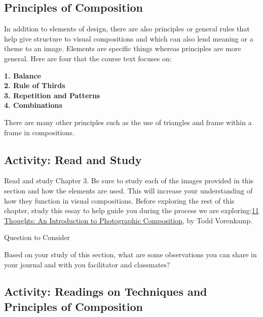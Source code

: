 \documentclass[
]{book}
\begin{document}
\hypertarget{principles-of-composition}{%
\subsection{Principles of Composition}\label{principles-of-composition}}

In addition to elements of design, there are also principles or general rules that help give structure to visual compositions and which can also lend meaning or a theme to an image. Elements are specific things whereas principles are more general. Here are four that the course text focuses on:

\textbf{1. Balance}\\
\textbf{2. Rule of Thirds}\\
\textbf{3. Repetition and Patterns}\\
\textbf{4. Combinations}

There are many other principles such as the use of triangles and frame within a frame in compositions.

\hypertarget{activity-read-and-study}{%
\subsection*{Activity: Read and Study}\label{activity-read-and-study}}

\begin{reflect}
Read and study Chapter 3. Be sure to study each of the images provided in this section and how the elements are used. This will increase your understanding of how they function in visual compositions.
Before exploring the rest of this chapter, study this essay to help guide you during the process we are exploring:\href{https://www.bhphotovideo.com/explora/photography/tips-and-solutions/11-thoughts-introduction-photographic-composition}{11 Thoughts: An Introduction to Photographic Composition}, by Todd Vorenkamp.

{Question to Consider}

Based on your study of this section, what are some observations you can share in your journal and with you facilitator and classmates?
\end{reflect}

\hypertarget{activity-readings-on-techniques-and-principles-of-composition}{%
\subsection*{Activity: Readings on Techniques and Principles of Composition}\label{activity-readings-on-techniques-and-principles-of-composition}}
\end{document}
